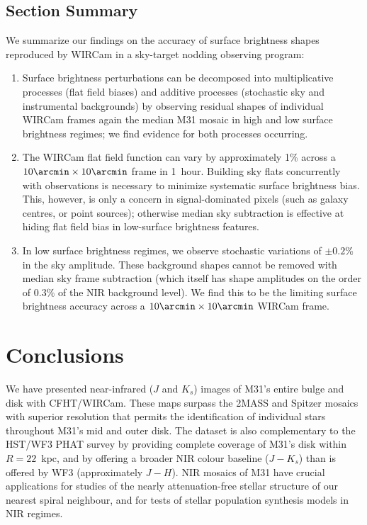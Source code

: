 \documentclass[iop]{emulateapj}
\begin{document}
\subsection{Section Summary}
\label{sec:shapeconclusions}

We summarize our findings on the accuracy of surface brightness shapes reproduced by WIRCam in a sky-target nodding observing program:

\begin{enumerate}
  \item Surface brightness perturbations can be decomposed into multiplicative processes (flat field biases) and additive processes (stochastic sky and instrumental backgrounds) by observing residual shapes of individual WIRCam frames again the median M31 mosaic in high and low surface brightness regimes; we find evidence for both processes occurring.
  \item The WIRCam flat field function can vary by approximately 1\% across a $10\arcmin \times 10\arcmin$ frame in 1~hour. Building sky flats concurrently with observations is necessary to minimize systematic surface brightness bias. This, however, is only a concern in signal-dominated pixels (such as galaxy centres, or point sources); otherwise median sky subtraction is effective at hiding flat field bias in low-surface brightness features.
  \item In low surface brightness regimes, we observe stochastic variations of $\pm 0.2$\% in the sky amplitude. These background shapes cannot be removed with median sky frame subtraction (which itself has shape amplitudes on the order of $0.3\%$ of the NIR background level). We find this to be the limiting surface brightness accuracy across a $10\arcmin \times 10\arcmin$ WIRCam frame.
\end{enumerate}

\section{Conclusions}
\label{sec:conclusions}

We have presented near-infrared ($J$ and $K_s$) images of M31's entire bulge and disk with CFHT/WIRCam.
These maps surpass the 2MASS \citep{Beaton:2007} and Spitzer \citep{Barmby:2006} mosaics with superior resolution that permits the identification of individual stars throughout M31's mid and outer disk.
The dataset is also complementary to the HST/WF3 PHAT survey \citep{Dalcanton:2012} by providing complete coverage of M31's disk within $R=22$~kpc, and by offering a broader NIR colour baseline ($J-K_s$) than is offered by WF3 (approximately $J-H$).
NIR mosaics of M31 have crucial applications for studies of the nearly attenuation-free stellar structure of our nearest spiral neighbour, and for tests of stellar population synthesis models in NIR regimes.
\end{document}
